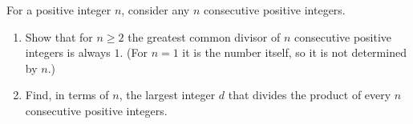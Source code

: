 For a positive integer $n$, consider any $n$ consecutive positive integers.
\begin{enumerate}
\item[(a)] Show that for $n\ge2$ the greatest common divisor of $n$ consecutive positive integers is always $1$. (For $n=1$ it is the number itself, so it is not determined by $n$.)
\item[(b)] Find, in terms of $n$, the largest integer $d$ that divides the product of every $n$ consecutive positive integers.
\end{enumerate}
